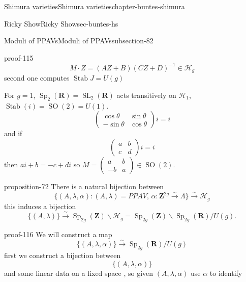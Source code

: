 \documentclass[oneside,10pt,]{book}
\numberwithin{equation}{section}
\newcommand{\inv}{^{-1}}
\newcommand{\ZZ}{\mathbf{Z}}
\newcommand{\RR}{\mathbf{R}}
\DeclareMathOperator{\Stab}{Stab}
\DeclareMathOperator{\SL}{SL}
\DeclareMathOperator{\specialorthogonal}{SO}
\DeclareMathOperator{\Sp}{Sp}
\newcommand{\amp}{&}
\begin{document}
\begin{chapterptx}{Shimura varieties}{}{Shimura varieties}{}{}{chapter-buntes-shimura}
\begin{sectionptx}{Ricky Show}{}{Ricky Show}{}{}{sec-buntes-hs}
\begin{subsectionptx}{Moduli of PPAVs}{}{Moduli of PPAVs}{}{}{subsection-82}
\begin{proofptx}{}{proof-115}
\begin{equation*}
\end{equation*}
%
\begin{equation*}
M\cdot Z = (AZ+B)(CZ+D)\inv \in \mathscr H_g
\end{equation*}
second one computes \(\Stab J = U(g)\)%
\par
\hypertarget{p-1132}{}%
For \(g= 1\), \(\Sp_2(\RR) = \SL_2(\RR)\) acts transitively on \(\mathscr H_1\), \(\Stab(i) = \specialorthogonal (2) = U(1)\).%
\begin{equation*}
\begin{pmatrix} \cos \theta\amp \sin \theta \\ - \sin \theta \amp \cos \theta \end{pmatrix} i = i
\end{equation*}
and if%
\begin{equation*}
\begin{pmatrix} a \amp b \\ c \amp d\end{pmatrix} i = i
\end{equation*}
then \(ai + b = -c + di\) so \(M= \begin{pmatrix} a\amp b\\ -b \amp a \end{pmatrix}\in \specialorthogonal(2)\).%
\end{proofptx}
\begin{proposition}{}{}{proposition-72}%
\hypertarget{p-1133}{}%
There is a natural bijection between%
\begin{equation*}
\{(A,\lambda, \alpha) : (A,\lambda)= PPAV,\,\alpha\colon \ZZ^{2g} \xrightarrow \sim \Lambda\} \xrightarrow\sim \mathscr H_g
\end{equation*}
this induces a  bijection%
\begin{equation*}
\{(A,\lambda) \} \xrightarrow \sim \Sp_{2g}(\ZZ) \backslash \mathscr H_g = \Sp_{2g}(\ZZ) \backslash \Sp_{2g} (\RR) / U(g)\text{.}
\end{equation*}
%
\end{proposition}
\begin{proofptx}{}{proof-116}
\hypertarget{p-1134}{}%
We will construct a map%
\begin{equation*}
\{(A,\lambda ,\alpha)\} \xrightarrow\sim\Sp_{2g} (\RR)/U(g)
\end{equation*}
first we construct  a bijection between%
\begin{equation*}
\{(A,\lambda, \alpha)\}
\end{equation*}
and some linear data on a fixed space , so given \((A, \lambda, \alpha)\) use \(\alpha\) to identify%

\end{proofptx}
\end{subsectionptx}
\end{sectionptx}
\end{chapterptx}
\end{document}

